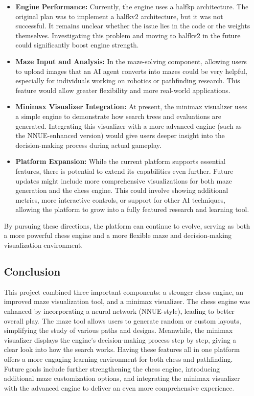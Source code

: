 \documentclass[12pt,a4paper]{article}
\begin{document}
\begin{itemize}
    \item \textbf{Engine Performance:} Currently, the engine uses a halfkp
    architecture. The original plan was to implement a halfkv2 architecture,
    but it was not successful. It remains unclear whether the issue lies in the
    code or the weights themselves. Investigating this problem and moving to
    halfkv2 in the future could significantly boost engine strength.

    \item \textbf{Maze Input and Analysis:} In the maze-solving component,
    allowing users to upload images that an AI agent converts into mazes
    could be very helpful, especially for individuals working on robotics or
    pathfinding research. This feature would allow greater flexibility and
    more real-world applications.

    \item \textbf{Minimax Visualizer Integration:} At present, the minimax
    visualizer uses a simple engine to demonstrate how search trees and
    evaluations are generated. Integrating this visualizer with a more advanced
    engine (such as the NNUE-enhanced version) would give users deeper insight
    into the decision-making process during actual gameplay.

    \item \textbf{Platform Expansion:} While the current platform supports
    essential features, there is potential to extend its capabilities even
    further. Future updates might include more comprehensive visualizations
    for both maze generation and the chess engine. This could involve showing
    additional metrics, more interactive controls, or support for other AI
    techniques, allowing the platform to grow into a fully featured research
    and learning tool.
\end{itemize}

By pursuing these directions, the platform can continue to evolve, serving as
both a more powerful chess engine and a more flexible maze and decision-making
visualization environment.

\subsection{Conclusion}
\label{sec:conclusion}
This project combined three important components: a stronger chess engine, an improved maze visualization tool, and a minimax visualizer. The chess engine was enhanced by incorporating a neural network (NNUE-style), leading to better overall play. The maze tool allows users to generate random or custom layouts, simplifying the study of various paths and designs. Meanwhile, the minimax visualizer displays the engine’s decision-making process step by step, giving a clear look into how the search works. Having these features all in one platform offers a more engaging learning environment for both chess and pathfinding. Future goals include further strengthening the chess engine, introducing additional maze customization options, and integrating the minimax visualizer with the advanced engine to deliver an even more comprehensive experience.
\end{document}
